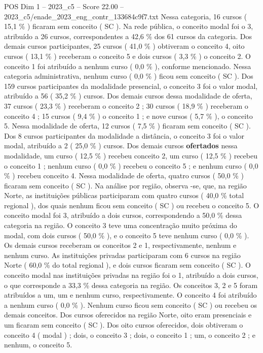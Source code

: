 \begin{textsample}{POS Dim 1 – 2023\_c5 – Score 22.00 – 2023\_c5/enade\_2023\_eng\_contr\_133684c9f7.txt}
Nessa categoria, 16 cursos ( 15,1 \% ) ficaram sem conceito ( SC ).
Na rede pública, o conceito modal foi o 3, atribuído a 26 cursos, correspondentes a 42,6 \% dos 61 cursos da categoria.
Dos demais cursos participantes, 25 cursos ( 41,0 \% ) obtiveram o conceito 4, oito cursos ( 13,1 \% ) receberam o conceito 5 e dois cursos ( 3,3 \% ) o conceito 2.
O conceito 1 foi atribuído a nenhum curso ( 0,0 \% ), conforme mencionado.
Nessa categoria administrativa, nenhum curso ( 0,0 \% ) ficou sem conceito ( SC ).
Dos 159 cursos participantes da modalidade presencial, o conceito 3 foi o valor modal, atribuído a 56 ( 35,2 \% ) cursos.
Dos demais cursos dessa modalidade de oferta, 37 cursos ( 23,3 \% ) receberam o conceito 2 ; 30 cursos ( 18,9 \% ) receberam o conceito 4 ; 15 cursos ( 9,4 \% ) o conceito 1 ; e nove cursos ( 5,7 \% ), o conceito 5.
Nessa modalidade de oferta, 12 cursos ( 7,5 \% ) ficaram sem conceito ( SC ).
Dos 8 cursos participantes da modalidade a distância, o conceito 3 foi o valor modal, atribuído a 2 ( 25,0 \% ) cursos.
Dos demais cursos \textbf{ofertados} nessa modalidade, um curso ( 12,5 \% ) recebeu conceito 2, um curso ( 12,5 \% ) recebeu o conceito 1 ; nenhum curso ( 0,0 \% ) recebeu o conceito 5 ; e nenhum curso ( 0,0 \% ) recebeu conceito 4.
Nessa modalidade de oferta, quatro cursos ( 50,0 \% ) ficaram sem conceito ( SC ).
Na análise por região, observa -se, que, na região Norte, as instituições públicas participaram com quatro cursos ( 40,0 \% total regional ), dos quais nenhum ficou sem conceito ( SC ) ou recebeu o conceito 5.
O conceito modal foi 3, atribuído a dois cursos, correspondendo a 50,0 \% dessa categoria na região.
O conceito 3 teve uma concentração muito próxima do modal, com dois cursos ( 50,0 \% ), e o conceito 5 teve nenhum curso ( 0,0 \% ).
Os demais cursos receberam os conceitos 2 e 1, respectivamente, nenhum e nenhum curso.
As instituições privadas participaram com 6 cursos na região Norte ( 60,0 \% do total regional ), e dois cursos ficaram sem conceito ( SC ).
O conceito modal nas instituições privadas na região foi o 1, atribuído a dois cursos, o que corresponde a 33,3 \% dessa categoria na região.
Os conceitos 3, 2 e 5 foram atribuídos a um, um e nenhum curso, respectivamente.
O conceito 4 foi atribuído a nenhum curso ( 0,0 \% ).
Nenhum curso ficou sem conceito ( SC ) ou recebeu os demais conceitos.
Dos cursos oferecidos na região Norte, oito eram presenciais e um ficaram sem conceito ( SC ).
Dos oito cursos oferecidos, dois obtiveram o conceito 4 ( modal ) ; dois, o conceito 3 ; dois, o conceito 1 ; um, o conceito 2 ; e nenhum, o conceito 5.

\end{textsample}
